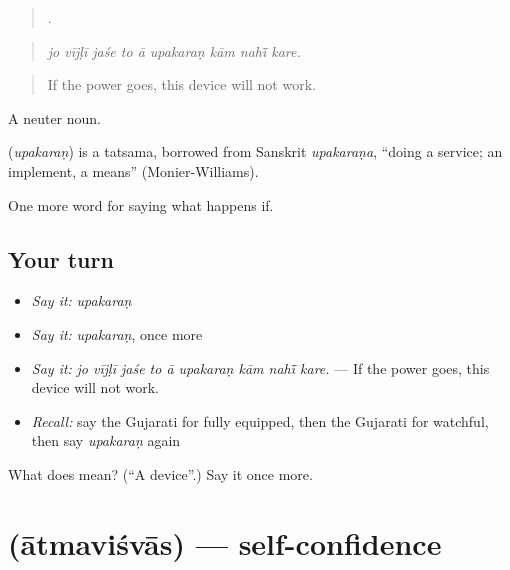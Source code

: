 \begin{quote}
        .
\end{quote}

\begin{quote}
\emph{jo vījḷī jaśe to ā upakaraṇ kām nahī̃ kare.}
\end{quote}

\begin{quote}
If the power goes, this device will not work.
\end{quote}

A neuter noun.

\begin{cousinweb}
\textbf{} (\emph{upakaraṇ}) is a tatsama, borrowed from Sanskrit \emph{upakaraṇa}, \textquotedblleft{}doing a service; an implement, a means\textquotedblright{} (Monier-Williams).
\end{cousinweb}

\begin{grammarlens}[title={What you've built}]
One more word for saying what happens if.
\end{grammarlens}

\subsection*{Your turn}
\begin{itemize}
\raggedright
  \item \emph{Say it:} \emph{upakaraṇ}
  \item \emph{Say it:} \emph{upakaraṇ}, once more
  \item \emph{Say it:} \emph{jo vījḷī jaśe to ā upakaraṇ kām nahī̃ kare.} — If the power goes, this device will not work.
  \item \emph{Recall:} say the Gujarati for fully equipped, then the Gujarati for watchful, then say \emph{upakaraṇ} again
\end{itemize}

\begin{tcolorbox}[breakable,colback=teal!4,colframe=teal!35!black,title={Before you move on}]
What does  mean? (\textquotedblleft{}A device\textquotedblright{}.) Say it once more.
\end{tcolorbox}
\section[\texorpdfstring{\gu{આત્મવિશ્વાસ} (ātmaviśvās)}{આત્મવિશ્વાસ (ātmaviśvās)}]{ (ātmaviśvās) — self-confidence}

